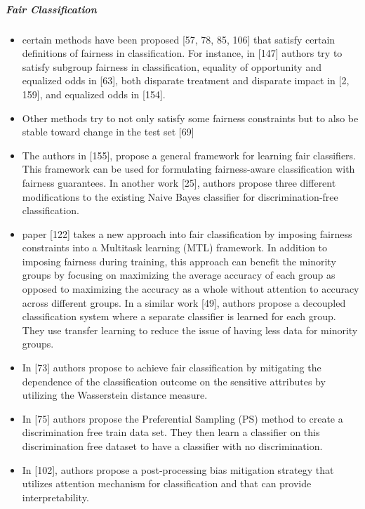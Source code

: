 \documentclass[12pt, a4paper, oneside]{book}   	%
\begin{document}
			\subparagraph{Fair Classification}
				\begin{itemize}
					\item certain methods have been proposed [57, 78, 85, 106] that satisfy certain definitions of fairness in classification. For instance, in [147] authors try to satisfy subgroup fairness in classification, equality of opportunity and equalized odds in [63], both disparate treatment and disparate impact in [2, 159], and equalized odds in [154]. \autocite{Mehrabi_2021}
					\item Other methods try to not only satisfy some fairness constraints but to also be stable toward change in the test set [69] \autocite{Mehrabi_2021}
					\item The authors in [155], propose a general framework for learning fair classifiers. This framework can be used for formulating fairness-aware classification with fairness guarantees.
					In another work [25], authors propose three different modifications to the existing Naive Bayes classifier for discrimination-free classification.\autocite{Mehrabi_2021}
					\item paper [122] takes a new approach into fair classification by imposing fairness constraints into a Multitask learning (MTL) framework. In addition to imposing fairness during training, this approach can benefit the minority groups by focusing on maximizing the average accuracy of each group as opposed to maximizing the accuracy as a whole without attention to accuracy across different groups. In a similar work [49], authors propose a decoupled classification system where a separate classifier is learned for each group. They use transfer learning to reduce the issue of having less data for minority groups.\autocite{Mehrabi_2021}
					\item In [73] authors propose to achieve fair classification by mitigating the dependence of the classification outcome on the sensitive attributes by utilizing the Wasserstein distance measure.\autocite{Mehrabi_2021}
					\item In [75] authors propose the Preferential Sampling (PS) method to create a discrimination free train data set. They then learn a classifier on this discrimination free dataset to have a classifier with no discrimination.\autocite{Mehrabi_2021}
					\item In [102], authors propose a post-processing bias mitigation strategy that utilizes attention mechanism for classification and that can provide interpretability. \autocite{Mehrabi_2021}
				\end{itemize}
				
\end{document}
